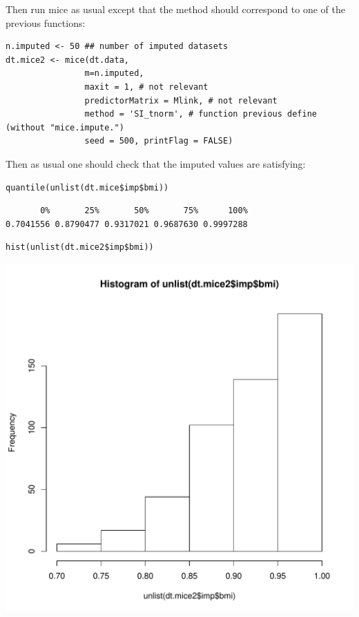 \documentclass[12pt]{article}
\begin{document}
Then run mice as usual except that the method should correspond to one of the previous functions:
\lstset{language=r,label= ,caption= ,captionpos=b,numbers=none}
\begin{lstlisting}
n.imputed <- 50 ## number of imputed datasets
dt.mice2 <- mice(dt.data,
				m=n.imputed, 
				maxit = 1, # not relevant
				predictorMatrix = Mlink, # not relevant
				method = 'SI_tnorm', # function previous define (without "mice.impute.")
				seed = 500, printFlag = FALSE)
\end{lstlisting}

Then as usual one should check that the imputed values are satisfying:
\lstset{language=r,label= ,caption= ,captionpos=b,numbers=none}
\begin{lstlisting}
quantile(unlist(dt.mice$imp$bmi))
\end{lstlisting}

\begin{verbatim}
       0%       25%       50%       75%      100% 
0.7041556 0.8790477 0.9317021 0.9687630 0.9997288
\end{verbatim}

\lstset{language=r,label= ,caption= ,captionpos=b,numbers=none}
\begin{lstlisting}
hist(unlist(dt.mice2$imp$bmi))
\end{lstlisting}

\begin{center}
\includegraphics[width=.9\linewidth]{./histImputed2.pdf}
\end{center}
\end{document}
